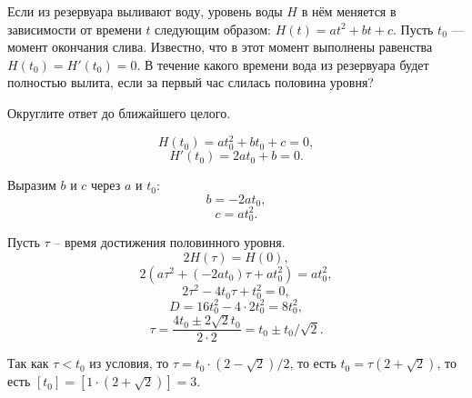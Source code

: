 
Если из резервуара выливают воду, уровень воды $H$ в нём меняется в зависимости от времени $t$ следующим образом: $H(t)=at^2+bt+c$. Пусть $t_0$ — момент окончания слива. Известно, что в этот момент выполнены равенства $H(t_0)= H'(t_0)=0$. В течение какого времени вода из резервуара будет полностью вылита, если за первый час слилась половина уровня? 

Округлите ответ до ближайшего целого.

\solutionSection

$$H(t_0) = at_0^2 + bt_0 + c = 0,$$
$$H'(t_0) = 2at_0 + b = 0.$$

Выразим $b$ и $c$ через $a$ и $t_0$:
$$b = -2at_0,$$
$$c = at_0^2.$$

Пусть $\tau$ -- время достижения половинного уровня.
$$2H(\tau) = H(0),$$
$$2(a\tau^2 + (-2at_0)\tau+at_0^2) = at_0^2,$$
$$2\tau^2 - 4t_0\tau + t_0^2 = 0,$$
$$D = 16t_0^2 - 4\cdot 2t_0^2 = 8t_0^2,$$
$$\tau = \frac{4t_0\pm 2\sqrt{2}t_0}{2\cdot 2}=t_0\pm t_0/\sqrt{2}.$$

Так как $\tau < t_0$ из условия, то $\tau = t_0\cdot(2 -\sqrt{2})/2$, то есть $t_0 = \tau(2 + \sqrt{2})$, то есть $[t_0] = [1\cdot(2 + \sqrt{2})] = 3.$

